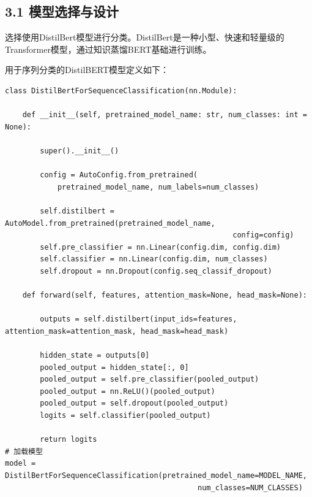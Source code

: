 \documentclass{article}
\begin{document}
\subsection*{3.1 模型选择与设计}
选择使用DistilBert模型进行分类。DistilBert是一种小型、快速和轻量级的Transformer模型，通过知识蒸馏BERT基础进行训练。\par
用于序列分类的DistilBERT模型定义如下：
\begin{lstlisting}[style=Style]
    class DistilBertForSequenceClassification(nn.Module):

    def __init__(self, pretrained_model_name: str, num_classes: int = None):

        super().__init__()

        config = AutoConfig.from_pretrained(
            pretrained_model_name, num_labels=num_classes)

        self.distilbert = AutoModel.from_pretrained(pretrained_model_name,
                                                    config=config)
        self.pre_classifier = nn.Linear(config.dim, config.dim)
        self.classifier = nn.Linear(config.dim, num_classes)
        self.dropout = nn.Dropout(config.seq_classif_dropout)

    def forward(self, features, attention_mask=None, head_mask=None):

        outputs = self.distilbert(input_ids=features, attention_mask=attention_mask, head_mask=head_mask)

        hidden_state = outputs[0]
        pooled_output = hidden_state[:, 0]
        pooled_output = self.pre_classifier(pooled_output)
        pooled_output = nn.ReLU()(pooled_output)
        pooled_output = self.dropout(pooled_output)
        logits = self.classifier(pooled_output)

        return logits
# 加载模型
model = DistilBertForSequenceClassification(pretrained_model_name=MODEL_NAME,
                                            num_classes=NUM_CLASSES)
\end{lstlisting}
\end{document}
